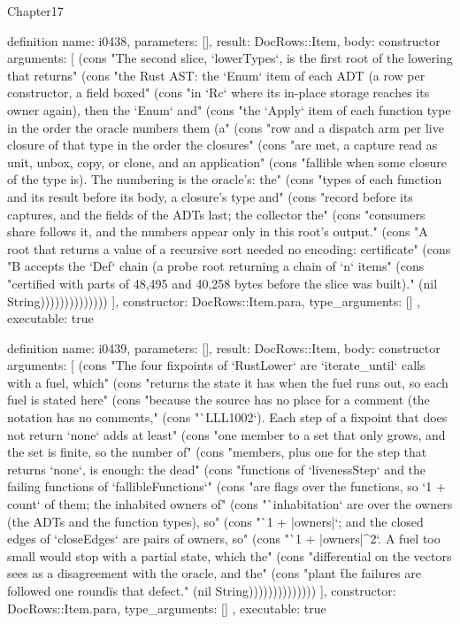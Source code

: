 \begin{lexlean}{Chapter17}
\begin{semanticmodule}
definition{
  name: i0438,
  parameters: [],
  result: DocRows::Item,
  body: constructor{
    arguments: [
      (cons "The second slice, `lowerTypes`, is the first root of the lowering that returns" (cons "the Rust AST: the `Enum` item of each ADT (a row per constructor, a field boxed" (cons "in `Rc` where its in-place storage reaches its owner again), then the `Enum` and" (cons "the `Apply` item of each function type in the order the oracle numbers them (a" (cons "row and a dispatch arm per live closure of that type in the order the closures" (cons "are met, a capture read as unit, unbox, copy, or clone, and an application" (cons "fallible when some closure of the type is). The numbering is the oracle's: the" (cons "types of each function and its result before its body, a closure's type and" (cons "record before its captures, and the fields of the ADTs last; the collector the" (cons "consumers share follows it, and the numbers appear only in this root's output." (cons "A root that returns a value of a recursive sort needed no encoding: certificate" (cons "B accepts the `Def` chain (a probe root returning a chain of `n` items" (cons "certified with parts of 48,495 and 40,258 bytes before the slice was built)." (nil String))))))))))))))
    ],
    constructor: DocRows::Item.para,
    type_arguments: []
  },
  executable: true
}

definition{
  name: i0439,
  parameters: [],
  result: DocRows::Item,
  body: constructor{
    arguments: [
      (cons "The four fixpoints of `RustLower` are `iterate_until` calls with a fuel, which" (cons "returns the state it has when the fuel runs out, so each fuel is stated here" (cons "because the source has no place for a comment (the notation has no comments," (cons "`LLL1002`). Each step of a fixpoint that does not return `none` adds at least" (cons "one member to a set that only grows, and the set is finite, so the number of" (cons "members, plus one for the step that returns `none`, is enough: the dead" (cons "functions of `livenessStep` and the failing functions of `fallibleFunctions`" (cons "are flags over the functions, so `1 + count` of them; the inhabited owners of" (cons "`inhabitation` are over the owners (the ADTs and the function types), so" (cons "`1 + |owners|`; and the closed edges of `closeEdges` are pairs of owners, so" (cons "`1 + |owners|^2`. A fuel too small would stop with a partial state, which the" (cons "differential on the vectors sees as a disagreement with the oracle, and the" (cons "plant \"the failures are followed one round\" is that defect." (nil String))))))))))))))
    ],
    constructor: DocRows::Item.para,
    type_arguments: []
  },
  executable: true
}


\end{semanticmodule}
\end{lexlean}
